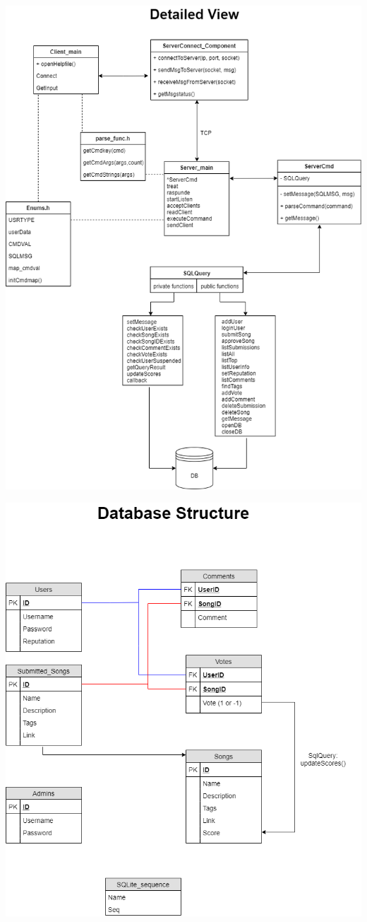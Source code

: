 \documentclass{article}
\begin{document}
\includegraphics[width=\textwidth]{details}
\pagebreak

\pagebreak
\includegraphics[width=\textwidth]{dbstruct}
\end{document}
